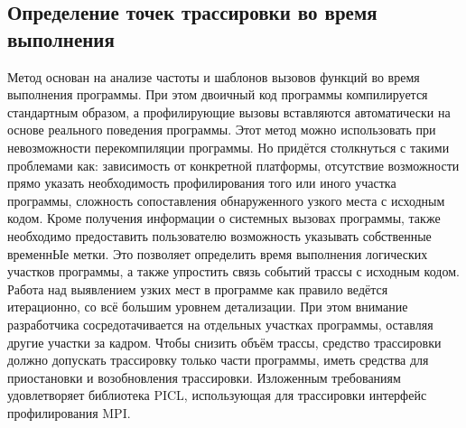 \subsection{Определение точек трассировки во время выполнения} Метод основан на анализе частоты и шаблонов вызовов функций во время выполнения программы. При этом двоичный код программы компилируется стандартным образом, а профилирующие вызовы вставляются автоматически на основе реального поведения программы. Этот метод можно использовать при невозможности перекомпиляции программы. Но придётся столкнуться с такими проблемами как: зависимость от конкретной платформы, отсутствие возможности прямо указать необходимость профилирования того или иного участка программы, сложность сопоставления обнаруженного узкого места с исходным кодом.
Кроме получения информации о системных вызовах программы, также необходимо предоставить пользователю возможность указывать собственные временнЫе метки. Это позволяет определить время выполнения логических участков программы, а также упростить связь событий трассы с исходным кодом.
Работа над выявлением узких мест в программе как правило ведётся итерационно, со всё большим уровнем детализации. При этом внимание разработчика сосредотачивается на отдельных участках программы, оставляя другие участки за кадром. Чтобы снизить объём трассы, средство трассировки должно допускать трассировку только части программы, иметь средства для приостановки и возобновления трассировки.
Изложенным требованиям удовлетворяет библиотека PICL, использующая для трассировки интерфейс профилирования MPI.
